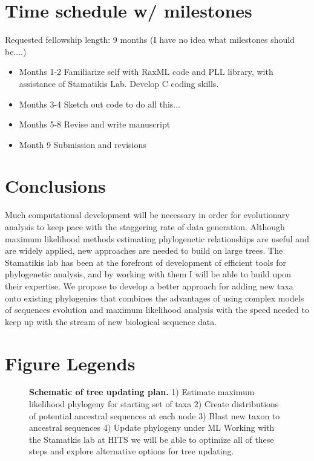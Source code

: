 \documentclass[10pt]{article}
\begin{document}
         
\section*{Time schedule w/ milestones}
   Requested fellowship length: 9 months
   (I have no idea what milestones should be....) %
 
\begin{itemize}
  \item{Months 1-2} Familiarize self with RaxML code and PLL library, with assistance of Stamatikis Lab. Develop C coding skills.
  \item{Months 3-4} Sketch out code to do all this... 
  \item{Months 5-8} Revise and write manuscript
  \item{Month 9} Submission and revisions
\end{itemize}


\section*{Conclusions}
Much computational development will be necessary in order for evolutionary analysis to keep pace with the staggering rate of data generation. Although maximum likelihood methods estimating phylogenetic relationships are useful and are widely applied, new approaches are needed to build on large trees. The Stamatikis lab has been at the forefront of development of efficient tools for phylogenetic analysis, and by working with them I will be able to build upon their expertise. We propose to develop a better approach for adding new taxa onto existing phylogenies that combines the advantages of using complex models of sequences evolution and maximum likelihood analysis with the speed needed to keep up with the stream of new biological sequence data. 


%


\section*{Figure Legends}
\begin{figure}[!ht]
\begin{center}
\end{center}
\caption{
{\bf Schematic of tree updating plan. }  1) Estimate maximum likelihood phylogeny for starting set of taxa 2) Create distributions of potential ancestral sequences at each node 3) Blast new taxon to ancestral sequences 4) Update phylogeny under ML Working with the Stamatkis lab at HITS we will be able to optimize all of these steps and explore alternative options for tree updating.
}
\label{Figure_label}
\end{figure}
\end{document}
